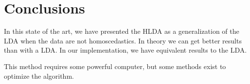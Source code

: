 \section{Conclusions}
\label{sec:conclusions}

In this state of the art, we have presented the HLDA as a
generalization of the LDA when the data are not homoscedastics.
In theory we can get better results than with a LDA.
In our implementation, we have equivalent results to the LDA.

This method requires some powerful computer, but some methods exist to
optimize the algorithm.
